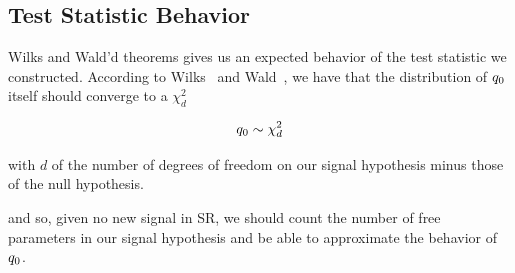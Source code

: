 \documentclass[../../ddppaper2.tex]{subfiles}
\begin{document}
\subsection{Test Statistic Behavior}

Wilks and Wald'd theorems gives us an expected behavior of the test statistic we constructed. According to Wilks~\cite{Wilks_Original} and Wald~\cite{Wald_Original}, we have that the distribution of ${q_{0}}$ itself should converge to a $\chi^2_d$

\begin{equation}
    {q_{0}} \sim \chi^2_{d}
\end{equation}

\noindent with $d$ of the number of degrees of freedom on our signal hypothesis minus those of the null hypothesis.

and so, given no new signal in SR, we should count the number of free parameters in our signal hypothesis and be able to approximate the behavior of ${q_{0}}$.
\end{document}
